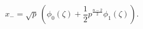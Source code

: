 \begin{equation}
x_{-}=\sqrt{p}\,\left(\phi_{0}(\zeta)+\frac{1}{2}
p^{\frac{n-2}{2}}\phi_{1}(\zeta)\right)\label{m2}.
\end{equation}

